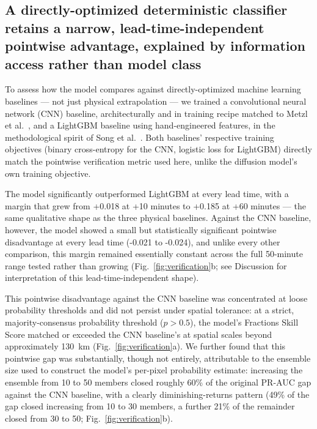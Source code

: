 \documentclass[pdflatex,sn-nature]{sn-jnl}%
\begin{document}
\subsection*{A directly-optimized deterministic classifier retains a narrow, lead-time-independent pointwise advantage, explained by information access rather than model class}

To assess how the model compares against directly-optimized machine
learning baselines --- not just physical extrapolation --- we trained a
convolutional neural network (CNN) baseline, architecturally and in
training recipe matched to Metzl et al.\ \citep{metzl2025physical}, and
a LightGBM \citep{ke2017lightgbm} baseline using hand-engineered
features, in the methodological spirit of Song et al.\
\citep{song2023lightning}. Both baselines' respective training
objectives (binary cross-entropy for the CNN, logistic loss for
LightGBM) directly match the pointwise verification metric used here,
unlike the diffusion model's own training objective.

The model significantly outperformed LightGBM at every lead time, with
a margin that grew from +0.018 at +10 minutes to +0.185 at +60 minutes
--- the same qualitative shape as the three physical baselines. Against
the CNN baseline, however, the model showed a small but statistically
significant pointwise disadvantage at every lead time (-0.021 to
-0.024), and unlike every other comparison, this margin remained
essentially constant across the full 50-minute range tested rather than
growing (Fig.~\ref{fig:verification}b; see Discussion for
interpretation of this lead-time-independent shape).

This pointwise disadvantage against the CNN baseline was concentrated
at loose probability thresholds and did not persist under spatial
tolerance: at a strict, majority-consensus probability threshold
($p > 0.5$), the model's Fractions Skill Score matched or exceeded the
CNN baseline's at spatial scales beyond approximately 130~km
(Fig.~\ref{fig:verification}a). We further found that this pointwise
gap was substantially, though not entirely, attributable to the
ensemble size used to construct the model's per-pixel probability
estimate: increasing the ensemble from 10 to 50 members closed roughly
60\% of the original PR-AUC gap against the CNN baseline, with a
clearly diminishing-returns pattern (49\% of the gap closed increasing
from 10 to 30 members, a further 21\% of the remainder closed from 30
to 50; Fig.~\ref{fig:verification}b).
\end{document}

